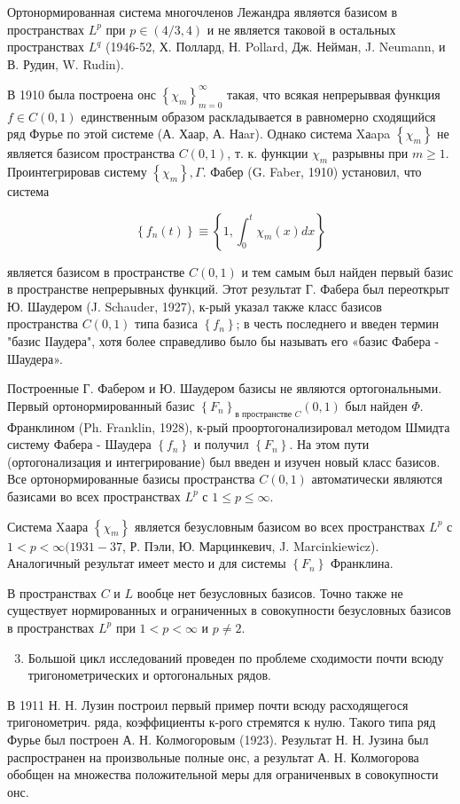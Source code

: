 \documentclass[10pt]{article}
\begin{document}
Ортонормированная система многочленов Лежандра являөтся базисом в пространствах $L^{p}$ при $p \in(4 / 3,4)$ и не является таковой в остальных пространствах $L^{q}$ (1946-52, Х. Поллард, Н. Pollard, Дж. Нейман, J. Neumann, и В. Рудин, W. Rudin).

В 1910 была построена онс $\left\{\chi_{m}\right\}_{m=0}^{\infty}$ такая, что всякая непрерыввая функция $f \in C(0,1)$ единственным образом раскладывается в равномерно сходящийся ряд Фурье по этой системе (А. Хаар, А. Наar). Однако система Xаapa $\left\{\chi_{m}\right\}$ не является базисом пространства $C(0,1)$, т. к. функции $\chi_{m}$ разрывны при $m \geqslant 1$. Проинтегрировав систему $\left\{\chi_{m}\right\}, \Gamma$. Фабер (G. Faber, 1910) установил, что система

\[
\left\{f_{n}(t)\right\} \equiv\left\{1, \int_{0}^{t} \chi_{m}(x) d x\right\}
\]

является базисом в пространстве $C(0,1)$ и тем самым был найден первый базис в пространстве непрерывных функций. Этот результат Г. Фабера был переоткрыт Ю. Шаудером (J. Schauder, 1927), к-рый указал также класс базисов пространства $C(0,1)$ типа базиса $\left\{f_{n}\right\}$; в честь последнего и введен термин "базис ІІаудера", хотя более справедливо было бы называть его «базис Фабера - Шаудера».

Построенные Г. Фабером и Ю. Шаудером базисы не являются ортогональными. Первый ортонормированный базис $\left\{F_{n}\right\}_{\text {в пространстве } C}(0,1)$ был найден $\Phi$. Франклином (Ph. Franklin, 1928), к-рый проортогонализировал методом Шмидта систему Фабера - Шаудера $\left\{f_{n}\right\}$ и получил $\left\{F_{n}\right\}$. На этом пути (ортогонализация и интегрирование) был введен и изучен новый класс базисов. Все ортонормированные базисы пространства $C(0,1)$ автоматически являются базисами во всех пространствах $L^{p}$ с $1 \leqslant p \leqslant \infty$.

Система Xаара $\left\{\chi_{m}\right\}$ является безусловным базисом во всех пространствах $L^{p}$ с $1<p<\infty(1931-37$, Р. Пэли, Ю. Марцинкевич, J. Marcinkiewicz). Аналогичный результат имеет место и для системы $\left\{F_{n}\right\}$ Франклина.

В пространствах $C$ и $L$ вообце нет безусловных базисов. Точно также не существует нормированных и ограниченных в совокупности безусловных базисов в пространствах $L^{p}$ при $1<p<\infty$ и $p \neq 2$.

\begin{enumerate}
  \setcounter{enumi}{2}
  \item Большой цикл исследований проведен по проблеме сходимости почти всюду тригонометрических и ортогональных рядов.
\end{enumerate}

В 1911 Н. Н. Лузин построил первый пример почти всюду расходящегося тригонометрич. ряда, коэффициенты к-рого стремятся к нулю. Такого типа ряд Фурье был построен А. Н. Колмогоровым (1923). Результат Н. Н. Јузина был распространен на произвольные полные онс, а результат А. Н. Колмогорова обобщен на множества положительной меры для ограниченвых в совокупности онс.
\end{document}
